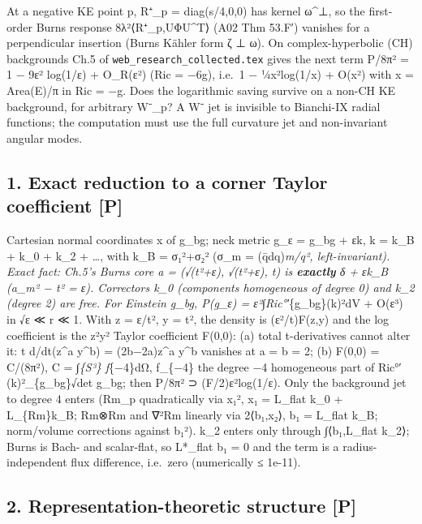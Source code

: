 \documentclass[
  10pt,
]{report}
\begin{document}
At a negative KE point p, R⁺\_p = diag(s/4,0,0) has kernel ω\^{}⊥, so
the first-order Burns response 8λ²⟨R⁺\_p,UΦU\^{}T⟩ (A02 Thm 53.F′)
vanishes for a perpendicular insertion (Burns Kähler form ζ ⊥ ω). On
complex-hyperbolic (CH) backgrounds Ch.5 of
\texttt{web\_research\_collected.tex} gives the next term P/8π² = 1 −
9ε² log(1/ε) + O\_R(ε²) (Ric = −6g), i.e.~1 − ¼x²log(1/x) + O(x²) with x
= Area(E)/π in Ric = −g. Does the logarithmic saving survive on a non-CH
KE background, for arbitrary W⁻\_p? A W⁻ jet is invisible to Bianchi-IX
radial functions; the computation must use the full curvature jet and
non-invariant angular modes.

\hypertarget{exact-reduction-to-a-corner-taylor-coefficient-p}{%
\subsection{1. Exact reduction to a corner Taylor coefficient
{[}P{]}}\label{exact-reduction-to-a-corner-taylor-coefficient-p}}

Cartesian normal coordinates x of g\_bg; neck metric g\_ε = g\_bg + εk,
k = k\_B + k\_0 + k\_2 + \ldots, with k\_B = σ₁²+σ₂² (σ\_m =
(q̄dq)\emph{m/\textbar q\textbar², left-invariant). Exact fact: Ch.5's
Burns core a = (√(t²+ε), √(t²+ε), t) is \textbf{exactly} δ + εk\_B
(a\_m² − t² = ε). Correctors k\_0 (components homogeneous of degree 0)
and k\_2 (degree 2) are free. For Einstein g\_bg, P(g\_ε) =
ε²∫\textbar Ric°′}\{g\_bg\}(k)\textbar²dV + O(ε³) in √ε ≪ r ≪ 1. With z
= ε/t², y = t², the density is (ε²/t)F(z,y) and the log coefficient is
the z²y² Taylor coefficient F(0,0): (a) total t-derivatives cannot alter
it: t d/dt(z\^{}a y\^{}b) = (2b−2a)z\^{}a y\^{}b vanishes at a = b = 2;
(b) F(0,0) = C/(8π²), C = ∫\emph{\{S³\} f}\{−4\}dΩ, f\_\{−4\} the degree
−4 homogeneous part of \textbar Ric°′(k)\textbar²\_\{g\_bg\}√det g\_bg;
then P/8π² ⊃ (F/2)ε²log(1/ε). Only the background jet to degree 4 enters
(Rm\_p quadratically via \textbar x₁\textbar², x₁ = L\_flat k\_0 +
L\_\{Rm\}k\_B; Rm⊗Rm and ∇²Rm linearly via 2⟨b₁,x₂⟩, b₁ = L\_flat k\_B;
norm/volume corrections against \textbar b₁\textbar²). k\_2 enters only
through ∫⟨b₁,L\_flat k\_2⟩; Burns is Bach- and scalar-flat, so L*\_flat
b₁ = 0 and the term is a radius-independent flux difference, i.e.~zero
(numerically ≤ 1e-11).

\hypertarget{representation-theoretic-structure-p}{%
\subsection{2. Representation-theoretic structure
{[}P{]}}\label{representation-theoretic-structure-p}}
\end{document}
